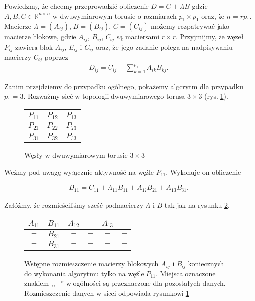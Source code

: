 Powiedzmy, że chcemy przeprowadzić obliczenie \(D = C + AB\) gdzie \(A, B, C\in\mathbb{R}^{n\times n}\) w dwuwymiarowym torusie o rozmiarach \(p_1 \times p_1\) oraz, że \(n=rp_1\). Macierze \(A=(A_{ij})\), \(B=(B_{ij})\), \(C=(C_{ij})\) możemy rozpatrywać jako macierze blokowe, gdzie \(A_{ij}\), \(B_{ij}\), \(C_{ij}\) są macierzami \(r\times r\). Przyjmijmy, że węzeł \(P_{ij}\) zawiera blok \(A_{ij}\), \(B_{ij}\) i \(C_{ij}\) oraz, że jego zadanie polega na nadpisywaniu macierzy \(C_{ij}\) poprzez
\begin{align}\label{eq:cannon_per_node}
D_{ij}=C_{ij} + \sum_{k=1}^{p_1} A_{ik}B_{kj}.
\end{align}

Zanim przejdziemy do przypadku ogólnego, pokażemy algorytm dla przypadku \(p_1 = 3\). Rozważmy sieć w topologii dwuwymiarowego torusa \(3\times 3\) (rys. \ref{fig:cannon_torus1}).

\begin{figure}[h]
\centering
\begin{tabular}{|C{1.5cm}|C{1.5cm}|C{1.5cm}|}
\hline
\(P_{11}\) & \(P_{12}\) & \(P_{13}\) \\
\hline
\(P_{21}\) & \(P_{22}\) & \(P_{23}\) \\
\hline
\(P_{31}\) & \(P_{32}\) & \(P_{33}\) \\
\hline
\end{tabular}
\caption{Węzły w dwuwymiarowym torusie \(3\times 3\)}
\label{fig:cannon_torus1}
\end{figure}

\noindent Weźmy pod uwagę wyłącznie aktywność na węźle \(P_{11}\). Wykonuje on obliczenie

\begin{align}\label{eq:cannon_torus1}
D_{11}=C_{11}+A_{11}B_{11} + A_{12}B_{21} + A_{13}B_{31}.
\end{align}

\noindent Załóżmy, że rozmieściliśmy sześć podmacierzy \(A\) i \(B\) tak jak na rysunku \ref{fig:cannon_torus2}.

\begin{figure}[h]
\centering
\begin{tabular}{|cc|cc|cc|}
\hline
\(A_{11}\) & \(B_{11}\) & \(A_{12}\) & \(-\) & \(A_{13}\) & \(-\) \\
\hline
\(-\) & \(B_{21}\) & \(-\) & \(-\) & \(-\) & \(-\) \\
\hline
\(-\) & \(B_{31}\) & \(-\) & \(-\) & \(-\) & \(-\) \\
\hline
\end{tabular}
\caption{Wstępne rozmieszczenie macierzy blokowych \(A_{ij}\) i \(B_{ij}\) koniecznych do wykonania algorytmu tylko na węźle \(P_{11}\). Miejsca oznaczone znakiem ,,\(-\)'' w ogólności są przeznaczone dla pozostałych danych. Rozmieszczenie danych w sieci odpowiada rysunkowi 
\ref{fig:cannon_torus1}}
\label{fig:cannon_torus2}
\end{figure}

